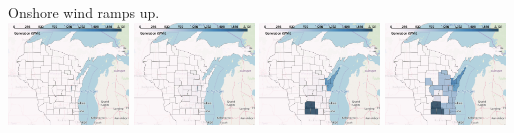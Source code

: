 \documentclass[xcolor=dvipsnames]{beamer}
\begin{document}
\begin{frame}
  Onshore wind ramps up. \\
  \includegraphics[width=0.24\textwidth]{includes/no_leakage_no_shutdowns_wind_r0.png}
  \includegraphics[width=0.24\textwidth]{includes/no_leakage_no_shutdowns_wind_r2.png}
  \includegraphics[width=0.24\textwidth]{includes/no_leakage_no_shutdowns_wind_r3.png}
  \includegraphics[width=0.24\textwidth]{includes/no_leakage_no_shutdowns_wind_r4.png}
\end{frame}
\end{document}

